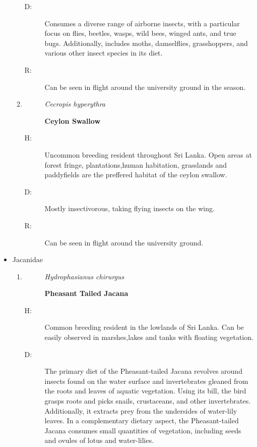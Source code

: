 \begin{itemize}
\begin{enumerate}
\begin{description}
\item[D: ]%
Consumes a diverse range of airborne insects, with a particular focus on flies, beetles, wasps, wild bees, winged ants, and true bugs. Additionally, includes moths, damselflies, grasshoppers, and various other insect species in its diet.%
\item[R: ]%
Can be seen in flight around the university ground in the season.%
\end{description}%
\item%
\begin{description}%
\item[]%
\textit{Cecropis hyperythra}%
\item[]%
\textbf{Ceylon Swallow}%
\end{description}%
\begin{description}%
\item[H: ]%
Uncommon breeding resident throughout Sri Lanka. Open areas at forest fringe, plantations,human habitation, grasslands and paddyfields are the preffered habitat of the ceylon swallow.%
\item[D: ]%
Mostly insectivorous, taking flying insects on the wing.%
\item[R: ]%
Can be seen in flight around the university ground.%
\end{description}%
\end{enumerate}%
\item%
Jacanidae%
\begin{enumerate}%
\item%
\begin{description}%
\item[]%
\textit{Hydrophasianus chirurgus}%
\item[]%
\textbf{Pheasant Tailed Jacana}%
\end{description}%
\begin{description}%
\item[H: ]%
Common breeding resident in the lowlands of Sri Lanka. Can be easily observed in marshes,lakes and tanks with floating vegetation.%
\item[D: ]%
The primary diet of the Pheasant{-}tailed Jacana revolves around insects found on the water surface and invertebrates gleaned from the roots and leaves of aquatic vegetation. Using its bill, the bird grasps roots and picks snails, crustaceans, and other invertebrates. Additionally, it extracts prey from the undersides of water{-}lily leaves. In a complementary dietary aspect, the Pheasant{-}tailed Jacana consumes small quantities of vegetation, including seeds and ovules of lotus and water{-}lilies.%

\end{description}
\end{enumerate}
\end{itemize}
